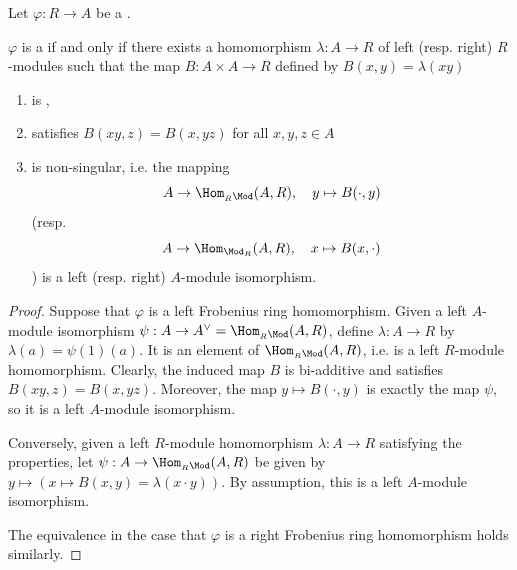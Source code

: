 \begin{lemma} \label{lemma:ring_homomorphism_is_left_right_frobenius_ring_homomorphism_iff_there_exists_a_homomorphism_from_the_target_to_the_source_ring_as_modules_such_that_biadditive_map_is_non_singular}
    Let $\varphi: R \to A$ be a . 

    $\varphi$ is a  if and only if there exists a homomorphism $\lambda: A \to R$ of left (resp. right) $R$-modules such that the map $B: A \times A \to R$ defined by $B(x,y) = \lambda(xy)$
    \begin{enumerate}
        \item is ,
        \item satisfies $B(xy,z) = B(x,yz)$ for all $x,y,z \in A$
        \item is non-singular, i.e. the mapping 
        $$A \to \Hom_{{}_R \Mod}(A,R), \quad y \mapsto B(\cdot, y)$$
        (resp.
        $$A \to \Hom_{\Mod_R}(A,R), \quad x \mapsto B(x,\cdot)$$
        )
        is a left (resp. right) $A$-module isomorphism.
    \end{enumerate}
\end{lemma}
\begin{proof}
    Suppose that $\varphi$ is a left Frobenius ring homomorphism. 
    Given a left $A$-module isomorphism $\psi: A \to A^\vee = \Hom_{{}_R \Mod}(A,R)$, define $\lambda: A \to R$ by $\lambda(a) = \psi(1)(a)$. It is an element of $\Hom_{{}_R \Mod}(A,R)$, i.e. is a left $R$-module homomorphism. Clearly, the induced map $B$ is bi-additive and satisfies $B(xy,z) = B(x,yz)$. Moreover, the map $y \mapsto B(\cdot, y)$ is exactly the map $\psi$, so it is a left $A$-module isomorphism.

    Conversely, given a left $R$-module homomorphism $\lambda: A \to R$ satisfying the properties, let $\psi: A \to \Hom_{{}_R \Mod}(A,R)$ be given by $y \mapsto (x \mapsto B(x,y) = \lambda(x \cdot y))$. By assumption, this is a left $A$-module isomorphism.

    The equivalence in the case that $\varphi$ is a right Frobenius ring homomorphism holds similarly.
\end{proof}